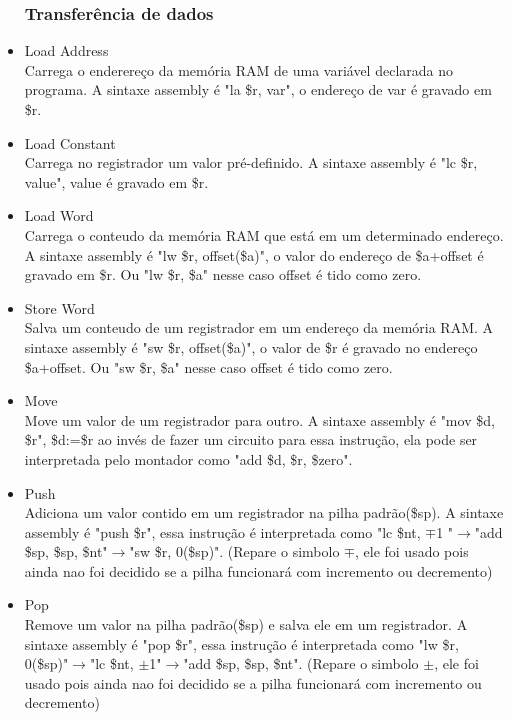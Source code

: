 \documentclass[a4paper, 10pt]{article}
\begin{document}
\begin{itemize}
	\subsubsection{Transferência de dados}
	\item Load Address\\
	Carrega o enderereço da memória RAM de uma variável declarada no programa. A sintaxe assembly é "la \$r, var", o endereço de var é gravado em \$r.
	\item Load Constant\\
	Carrega no registrador um valor pré-definido. A sintaxe assembly é "lc \$r, value", value é gravado em \$r.
	\item Load Word\\
	Carrega o conteudo da memória RAM que está em um determinado endereço. A sintaxe assembly é "lw \$r, offset(\$a)", o valor do endereço de \$a+offset é gravado em \$r. Ou "lw \$r, \$a" nesse caso offset é tido como zero.
	\item Store Word\\
	Salva um conteudo de um registrador em um endereço da memória RAM. A sintaxe assembly é "sw \$r, offset(\$a)", o valor de \$r é gravado no endereço \$a+offset. Ou "sw \$r, \$a" nesse caso offset é tido como zero.
	\item Move\\
	Move um valor de um registrador para outro. A sintaxe assembly é "mov \$d, \$r", \$d:=\$r ao invés de fazer um circuito para essa instrução, ela pode ser interpretada pelo montador como "add \$d, \$r, \$zero".
	\item  Push\\
	Adiciona um valor contido em um registrador na pilha padrão(\$sp). A sintaxe assembly é "push \$r", essa instrução é interpretada como "lc \$nt, $\mp$1 "$\rightarrow$"add \$sp, \$sp, \$nt"$\rightarrow$"sw \$r, 0(\$sp)". (Repare o simbolo $\mp$, ele foi usado pois ainda nao foi decidido se a pilha funcionará com incremento ou decremento)
	\item  Pop\\
	Remove um valor na pilha padrão(\$sp) e salva ele em um registrador. A sintaxe assembly é "pop \$r", essa instrução é interpretada como "lw \$r, 0(\$sp)"$\rightarrow$"lc \$nt, $\pm$1"$\rightarrow$"add \$sp, \$sp, \$nt". (Repare o simbolo $\pm$, ele foi usado pois ainda nao foi decidido se a pilha funcionará com incremento ou decremento)

\end{itemize}
\end{document}
